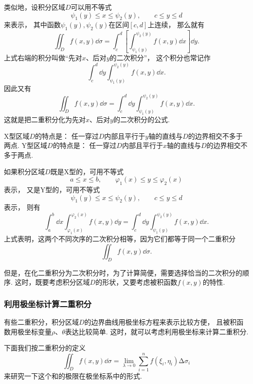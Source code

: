 类似地，设积分区域\(D\)可以用不等式\[
	\psi_1(y) \leq x \leq \psi_2(y), \qquad
	c \leq y \leq d
\]来表示，
其中函数\(\psi_1(y),\psi_2(y)\)在区间\([c,d]\)上连续，
那么就有\[
	\iint_D f(x,y) \dd{\sigma}
	= \int_c^d \left[ \int_{\psi_1(y)}^{\psi_2(y)} f(x,y) \dd{x} \right] \dd{y}.
\]
上式右端的积分叫做“先对\(x\)、后对\(y\)的二次积分”，
这个积分也常记作\[
	\int_c^d \dd{y} \int_{\psi_1(y)}^{\psi_2(y)} f(x,y) \dd{x}.
\]
因此又有\[
	\iint_D f(x,y) \dd{\sigma}
	= \int_c^d \dd{y} \int_{\psi_1(y)}^{\psi_2(y)} f(x,y) \dd{x}.
\]
这就是把二重积分化为先对\(x\)、后对\(y\)的二次积分的公式.

X型区域\(D\)的特点是：
任一穿过\(D\)内部且平行于\(y\)轴的直线与\(D\)的边界相交不多于两点.
Y型区域\(D\)的特点是：
任一穿过\(D\)内部且平行于\(x\)轴的直线与\(D\)的边界相交不多于两点.

如果积分区域\(D\)既是X型的，可用不等式\[
	a \leq x \leq b, \qquad
	\varphi_1(x) \leq y \leq \varphi_2(x)
\]表示，
又是Y型的，可用不等式\[
	\psi_1(y) \leq x \leq \psi_2(y), \qquad
	c \leq y \leq d
\]表示，
则有\[
	\int_a^b \dd{x}
	\int_{\varphi_1(x)}^{\varphi_2(x)} f(x,y) \dd{y}
	=\int_c^d \dd{y}
	\int_{\psi_1(y)}^{\psi_2(y)} f(x,y) \dd{x}.
\]
上式表明，这两个不同次序的二次积分相等，因为它们都等于同一个二重积分\[
	\iint_D f(x,y) \dd\sigma.
\]

但是，在化二重积分为二次积分时，为了计算简便，需要选择恰当的二次积分的顺序.
这时，既要考虑积分区域\(D\)的形状，又要考虑被积函数\(f(x,y)\)的特性.

\subsubsection{利用极坐标计算二重积分}
有些二重积分，积分区域\(D\)的边界曲线用极坐标方程来表示比较方便，
且被积函数用极坐标变量\(\rho\)、\(\theta\)表达比较简单.
这时，就可以考虑利用极坐标来计算二重积分.

下面我们按二重积分的定义\[
	\iint_D f(x,y) \dd{\sigma}
	= \lim\limits_{\lambda\to0} \sum\limits_{i=1}^n f(\xi_i,\eta_i) \increment\sigma_i
\]来研究一下这个和的极限在极坐标系中的形式.

\begin{figure}[ht]
	\centering
\end{figure}

